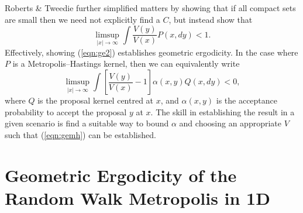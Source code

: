 \documentclass{article}
\begin{document}
Roberts \& Tweedie \cite{} further simplified matters by showing that if all compact sets are small then we need not explicitly find a $C$, but instead show that
\begin{equation} \label{eqn:ge2}
\limsup_{|x| \to \infty} \int \frac{V(y)}{V(x)} P(x,dy) < 1.
\end{equation}
Effectively, showing (\ref{eqn:ge2}) establishes geometric ergodicity.  In the case where $P$ is a Metropolis--Hastings kernel, then we can equivalently write
\begin{equation} \label{eqn:gemh}
\limsup_{|x| \to \infty} \int \left[ \frac{V(y)}{V(x)} - 1 \right] \alpha(x,y)Q(x,dy) < 0,
\end{equation}
where $Q$ is the proposal kernel centred at $x$, and $\alpha(x,y)$ is the acceptance probability to accept the proposal $y$ at $x$.  The skill in establishing the result in a given scenario is find a suitable way to bound $\alpha$ and choosing an appropriate $V$ such that (\ref{eqn:gemh}) can be established.

\section{Geometric Ergodicity of the Random Walk Metropolis in 1D}
\end{document}
